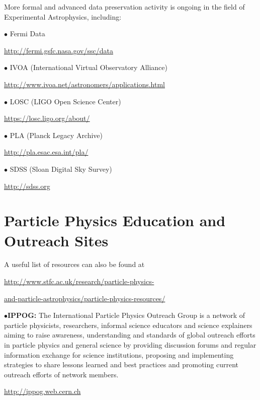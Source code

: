 \medskip


\medskip

More formal and advanced data preservation activity is ongoing in the field of Experimental Astrophysics, including:
\item{$\bullet$}
Fermi Data\item{}\qquad\url{http://fermi.gsfc.nasa.gov/ssc/data}
\item{$\bullet$}
IVOA (International Virtual Observatory Alliance) \item{}\qquad\url{http://www.ivoa.net/astronomers/applications.html}
\item{$\bullet$}
LOSC (LIGO Open Science Center) \item{}\qquad\url{https://losc.ligo.org/about/}
\item{$\bullet$}
PLA (Planck Legacy Archive)  \item{}\qquad\url{http://pla.esac.esa.int/pla/}
\item{$\bullet$}
SDSS (Sloan Digital Sky Survey) \item{}\qquad\url{http://sdss.org}
\medskip


\section{Particle Physics Education and Outreach Sites}  %

\medskip

A useful list of resources can also be found at
	\item{}\qquad\url{http://www.stfc.ac.uk/research/particle-physics-}
	\item{}\qquad\qquad\url{and-particle-astrophysics/particle-physics-resources/}

\medskip
\medskip


\medskip

\item{$\bullet$}{\bf IPPOG:}
The International Particle Physics Outreach Group is a network of particle physicists, researchers, informal science educators and science explainers aiming to raise awareness, understanding and standards of global outreach efforts in particle physics and general science by providing discussion forums and regular information exchange for science institutions, proposing and implementing strategies to share lessons learned and best practices and promoting current outreach efforts of network members.
	\item{}\qquad\url{http://ippog.web.cern.ch}

